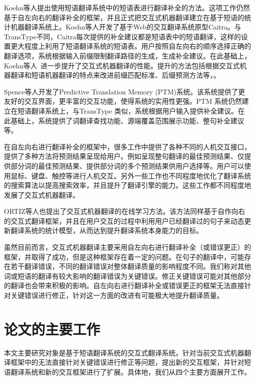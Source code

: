\documentclass[master, winfont]{njuthesis}
\begin{document}
Koehn等人\cite{koehn2009web}提出使用短语翻译系统中的短语表进行翻译补全的方法。这项工作仍然基于自左向右的翻译补全的框架，并且正式把交互式机器翻译建立在基于短语的统计机器翻译系统上。Koehn等人开发了基于Web的交互翻译系统原型Caitra。与TransType不同，Caitra每次提供的补全建议都是短语表中的短语翻译，这样的设置更大程度上利用了短语翻译系统的短语表。用户按照自左向右的顺序选择正确的翻译选项，系统根据输入前缀限制翻译路径的生成，生成补全建议。在此基础上，Koehn等人~\cite{koehnrefinements}进一步提升了交互式机器翻译的性能。提升的方法包括根据交互式机器翻译和短语机器翻译的特点来改进前缀匹配标准、后缀预测方法等，。

Spence等人\cite{green2014predictive}开发了Predictive Translation Memory (PTM)系统。该系统提供了更友好的交互界面，更丰富的交互功能，使得系统的实用性更强。PTM 系统仍然建立在短语翻译系统上，与TransType 类似，系统根据用户输入提供补全建议。在此基础上，系统提供了词翻译查找功能、源端覆盖范围展示功能、整句补全建议等。

在自左向右进行翻译补全的框架中，很多工作中提供了各种不同的人机交互接口，提供了多种方法将预测结果呈现给用户。例如呈现整句翻译的最佳预测结果、仅提供部分词的最佳预测结果、提供部分词的多个预测结果供用户选择等。用户可以使用鼠标、键盘、触控等进行人机交互\cite{langlais2000transtype,green2014predictive,koehn2009web,barrachina2009statistical}。另外一些工作\cite{och2003efficient,gonzalez2013interactive,sanchis2014efficient}也不同程度地优化了翻译系统的搜索算法以提高搜索效率，并且提升了翻译引擎的能力。这些工作都不同程度地发展了交互式机器翻译。

ORTIZ等人\cite{ortiz2010online}也提出了交互式机器翻译的在线学习方法。该方法同样基于自作向右的交互式翻译框架，并且在用户交互的过程中利用用户已经翻译过的句子来动态更新翻译系统的统计模型，从而达到提升翻译系统本身能力的目标。

虽然目前而言，交互式机器翻译主要采用自左向右进行翻译补全（或错误更正）的框架，并取得了成功，但是这种框架存在着一定的问题。在句子的翻译中，可能存在若干翻译错误，不同的翻译错误对整体翻译质量的影响程度不同。我们称对其他词或短语的翻译有较大影响的翻译错误为关键错误。修正关键错误可能对其他部分的翻译也会带来积极的影响。自左向右进行翻译补全或错误更正的框架无法直接针对关键错误进行修正，针对这一方面的改进有可能极大地提升翻译质量。

\section{论文的主要工作}
本文主要研究对象是基于短语翻译系统的交互式翻译系统。针对当前交互式机器翻译框架中的无法直接针对关键错误进行修正等问题，提出新的交互框架，并针对短语翻译系统和新的交互框架进行了扩展。具体地，我们从四个主要方面展开工作。
\end{document}
